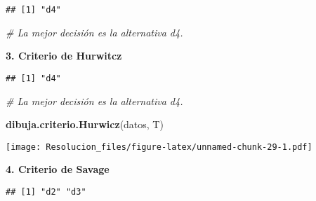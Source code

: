 \documentclass[
]{article}
\newenvironment{Shaded}{\begin{snugshade}}{\end{snugshade}}
\newcommand{\CommentTok}[1]{\textcolor[rgb]{0.56,0.35,0.01}{\textit{#1}}}
\newcommand{\FunctionTok}[1]{\textcolor[rgb]{0.13,0.29,0.53}{\textbf{#1}}}
\newcommand{\NormalTok}[1]{#1}
\newcommand{\OtherTok}[1]{\textcolor[rgb]{0.56,0.35,0.01}{#1}}
\newcommand{\SpecialCharTok}[1]{\textcolor[rgb]{0.81,0.36,0.00}{\textbf{#1}}}
\begin{document}
\begin{verbatim}
## [1] "d4"
\end{verbatim}

\begin{Shaded}
\begin{Highlighting}[]
\CommentTok{\# La mejor decisión es la alternativa d4.}
\end{Highlighting}
\end{Shaded}

\textbf{3. Criterio de Hurwitcz}

\begin{Shaded}
\end{Shaded}

\begin{verbatim}
## [1] "d4"
\end{verbatim}

\begin{Shaded}
\begin{Highlighting}[]
\CommentTok{\# La mejor decisión es la alternativa d4.}
\end{Highlighting}
\end{Shaded}

\begin{Shaded}
\begin{Highlighting}[]
\FunctionTok{dibuja.criterio.Hurwicz}\NormalTok{(datos, T)}
\end{Highlighting}
\end{Shaded}

\texttt{[image: Resolucion\_files/figure-latex/unnamed-chunk-29-1.pdf]}

\textbf{4. Criterio de Savage}

\begin{Shaded}
\end{Shaded}

\begin{verbatim}
## [1] "d2" "d3"
\end{verbatim}
\end{document}
